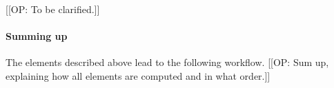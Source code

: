 \documentclass[letterpaper, 10pt, twocolumn]{article}
\newcommand{\COP}[1]{\textsf{[[OP: #1]]}}
\begin{document}
\COP{To be clarified.}

\paragraph{Summing up} The elements described above lead to the
following workflow. \COP{Sum up, explaining how all elements are
  computed and in what order.}

\end{document}

